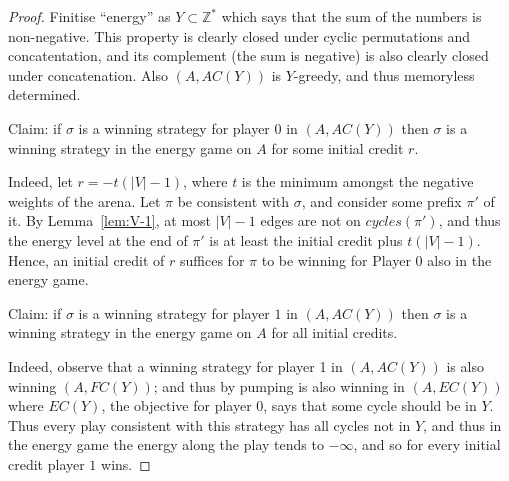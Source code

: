 \documentclass[a4paper,10pt]{article}
\begin{document}
\begin{proof}
Finitise ``energy'' as $Y \subset \mathbb{Z}^*$ which says that the sum of the numbers is non-negative. This property is clearly closed under cyclic permutations and concatentation, and its complement (the sum is negative) is also clearly closed under concatenation. Also $(A, AC(Y))$ is $Y$-greedy, and thus memoryless determined. 

Claim: if $\sigma$ is a winning strategy for player $0$ in $(A,AC(Y))$ then $\sigma$ is a winning strategy in the energy game on $A$ for some initial credit $r$.

Indeed, let $r = -t (|V|-1)$, where $t$ is the minimum amongst the negative weights of the arena. Let $\pi$ be consistent with $\sigma$, and consider some prefix $\pi'$ of it. 
By Lemma~\ref{lem:V-1}, at most $|V|-1$ edges are not on $cycles(\pi')$, and thus the energy level at the end of $\pi'$ is at least the initial credit plus $t(|V|-1)$. Hence, an initial credit of $r$ suffices for $\pi$ to be winning for Player $0$ also in the energy game. 

Claim: if $\sigma$ is a winning strategy for player $1$ in $(A,AC(Y))$ then $\sigma$ is a winning strategy in the energy game on $A$ for all initial credits.

Indeed, observe that a winning strategy for player 1 in $(A, AC(Y))$ is also winning $(A,FC(Y))$; and thus by pumping is also winning in $(A,EC(Y))$ where $EC(Y)$, the objective for player $0$, says that some cycle should be in $Y$. Thus every play consistent with this strategy has all cycles not in $Y$, and thus in the energy game the energy along the play tends to $-\infty$, and so for every initial credit player $1$ wins. 
\end{proof}
\end{document}
